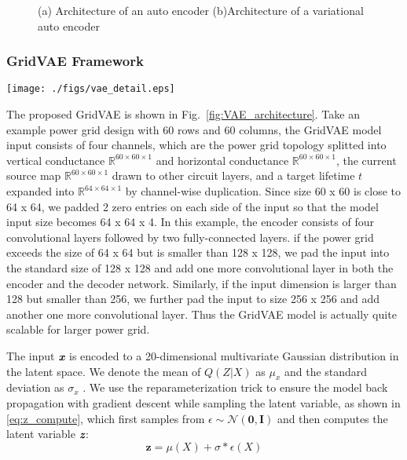 \begin{figure}[htp]
	\centering
	\caption{(a) Architecture of an auto encoder (b)Architecture of a variational auto encoder }
	\label{fig:compare_ae_vae}
\end{figure}


\subsubsection{GridVAE Framework}
\label{subsubsec:vae}



\begin{figure*}[h!]
	\centering
	\texttt{[image: ./figs/vae\_detail.eps]}
	\caption{The architecture of the proposed GridVAE for EM-aware IR drop prediction} 
	\label{fig:VAE_architecture}
\end{figure*}

The proposed GridVAE  is shown in Fig.~\ref{fig:VAE_architecture}. Take an example power grid design with 60 rows and 60 columns, the GridVAE model input consists of four channels, which are the power grid topology splitted into vertical conductance $\mathbb{R} ^{60\times 60\times 1}$ and horizontal conductance $\mathbb{R} ^{60\times 60\times 1}$,  the current source map $\mathbb{R} ^{60\times 60\times 1}$ drawn to other circuit layers, and a target lifetime $\textit{t}$ expanded into $\mathbb{R} ^{64\times 64\times 1}$ by channel-wise duplication. Since size 60 x 60 is close to 64 x 64, we padded 2 zero entries on each side of the input so that the model input size becomes 64 x 64 x 4.  In this example, the encoder consists of four convolutional layers followed by two fully-connected layers. if the power grid exceeds the size of 64 x 64 but is smaller than 128 x 128, we pad the input into the standard size of 128 x 128 and add one more convolutional layer in both the encoder and the decoder network.  Similarly, if the input dimension is larger than 128 but smaller than 256, we further pad the input to size 256 x 256 and add another one more convolutional layer. Thus the GridVAE model is actually quite scalable for larger power grid.

The input $\textit{\textbf{x}}$ is encoded to a 20-dimensional multivariate Gaussian distribution in the latent space. We denote the mean of $Q(Z|X)$ as  $\mu_{x}$   and the standard deviation as   $\sigma_{x}$ .
We use the reparameterization trick to ensure the model back propagation with gradient descent while sampling the latent variable, as shown in \eqref{eq:z_compute}, which first samples from $\epsilon \sim \mathcal{N}(\textbf{0}, \textbf{I} )$ and then computes the latent variable $\textit{\textbf{z}}$:
\begin{equation}
	\label{eq:z_compute}
	\textbf{z}  = \mu(\textit{X}) + \sigma \ast \epsilon(\textit{X})
\end{equation}

